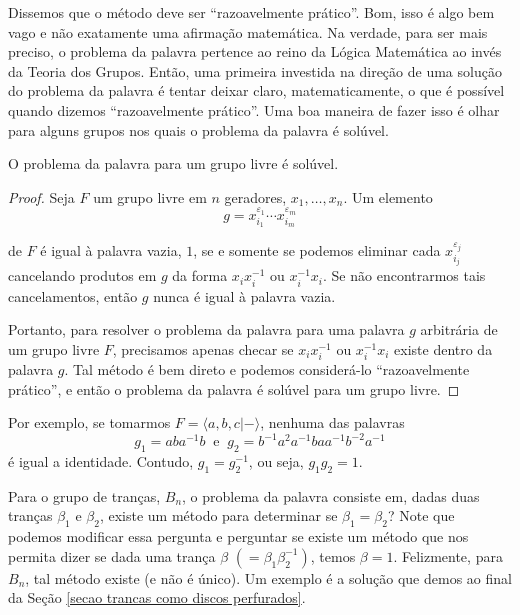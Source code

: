 	\par\vspace{0.3cm} Dissemos que o método deve ser ``razoavelmente prático''. Bom, isso é algo bem vago e não exatamente uma afirmação matemática. Na verdade, para ser mais preciso, o problema da palavra pertence ao reino da Lógica Matemática ao invés da Teoria dos Grupos. Então, uma primeira investida na direção de uma solução do problema da palavra é tentar deixar claro, matematicamente, o que é possível quando dizemos ``razoavelmente prático''. Uma boa maneira de fazer isso é olhar para alguns grupos nos quais o problema da palavra é solúvel.
	\begin{theorem}
		\label{problema da palavra soluvel para grupos livres}
		O problema da palavra para um grupo livre é solúvel.
	\end{theorem}
	\begin{proof}
		Seja $F$ um grupo livre em $n$ geradores, $x_1, \dots, x_n$. Um elemento 
		\begin{equation*}
		g = x_{i_1}^{\varepsilon_1}\cdots x_{i_m}^{\varepsilon_m}
		\end{equation*}
		\par\vspace{0.3cm} de $F$ é igual à palavra vazia, $1$, se e somente se podemos eliminar cada $x_{i_j}^{\varepsilon_j}$ cancelando produtos em $g$ da forma $x_ix_i^{-1}$ ou $x_i^{-1}x_i$. Se não encontrarmos tais cancelamentos, então $g$ nunca é igual à palavra vazia.
		\par\vspace{0.3cm} Portanto, para resolver o problema da palavra para uma palavra $g$ arbitrária de um grupo livre $F$, precisamos apenas checar se $x_ix_i^{-1}$ ou $x_i^{-1}x_i$ existe dentro da palavra $g$. Tal método é bem direto e podemos considerá-lo ``razoavelmente prático'', e então o problema da palavra é solúvel para um grupo livre. 
	\end{proof}
	\par\vspace{0.3cm} Por exemplo, se tomarmos $F = \langle a,b,c|- \rangle$, nenhuma das palavras 
	\begin{equation*}
	g_1 = aba^{-1}b \ \text{ e } \ g_2 = b^{-1}a^2a^{-1}baa^{-1}b^{-2}a^{-1}
	\end{equation*}
	é igual a identidade. Contudo, $g_1 = g_2^{-1}$, ou seja, $g_1g_2 = 1$.
	\par\vspace{0.3cm} Para o grupo de tranças, $B_n$, o problema da palavra consiste em, dadas duas tranças $\beta_1$ e $\beta_2$, existe um método para determinar se $\beta_1 = \beta_2$? Note que podemos modificar essa pergunta e perguntar se existe um método que nos permita dizer se dada uma trança $\beta$ $(=\beta_1\beta_2^{-1})$, temos $\beta = 1$. Felizmente, para $B_n$, tal método existe (e não é único). Um exemplo é a solução que demos ao final da Seção \eqref{secao trancas como discos perfurados}.
	
